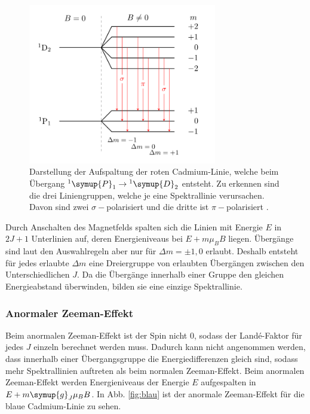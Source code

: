                 \begin{figure}
                    \centering
                    \includegraphics[height=7cm]{rot.png}
                    \caption{Darstellung der Aufspaltung der roten Cadmium-Linie, welche beim Übergang 
                    $^{1}\symup{P}_1 \to$\,$^{1}\symup{D}_2$ entsteht. Zu erkennen sind die drei Liniengruppen, welche 
                    je eine Spektrallinie verursachen. Davon sind zwei $\sigma-$polarisiert und die dritte ist $\pi-$polarisiert \cite{josh}.}
                    \label{fig:rot}
                \end{figure}

                Durch Anschalten des Magnetfelds spalten sich die Linien mit Energie $E$ 
                in $2J+1$ Unterlinien auf, deren Energieniveaus bei $E+m\mu_B B$ liegen. 
                Übergänge sind laut den Auswahlregeln aber nur für $\Delta m = \pm 1, 0$ erlaubt. 
                Deshalb entsteht für jedes erlaubte $\Delta m$ eine Dreiergruppe von erlaubten
                Übergängen zwischen den Unterschiedlichen $J$. 
                Da die Übergänge innerhalb einer Gruppe den gleichen Energieabstand überwinden, 
                bilden sie eine einzige Spektrallinie.


            \subsubsection{Anormaler Zeeman-Effekt}

               Beim anormalen Zeeman-Effekt ist der Spin nicht 0, sodass der Land\'{e}-Faktor für jedes 
               $J$ einzeln berechnet werden muss. Dadurch kann nicht angenommen werden, dass 
               innerhalb einer Übergangsgruppe die Energiedifferenzen gleich sind, sodass mehr Spektrallinien 
               auftreten als beim normalen Zeeman-Effekt. Beim anormalen Zeeman-Effekt werden 
               Energieniveaus der Energie $E$ aufgespalten in $E+m\symup{g}_J\mu_B B$.
               In Abb. \ref{fig:blau} ist der anormale Zeeman-Effekt 
               für die blaue Cadmium-Linie zu sehen. 
               
